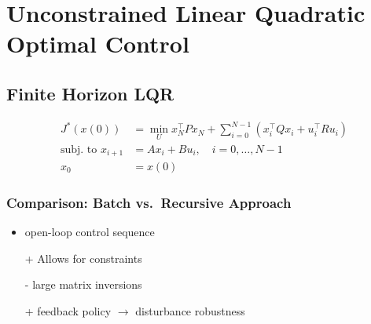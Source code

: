 \section{Unconstrained Linear Quadratic Optimal Control}
\subsection{Finite Horizon LQR}
\noindent
\begin{align*}
    J^*(x(0))                & = \min_U x_N^\top P x_N + \sum_{i=0}^{N-1} (x_i^\top Q x_i + u_i^\top R u_i) \\
    \text{subj.\ to }x_{i+1} & = A x_i + B u_i, \quad i = 0, \dots, N-1                                     \\
    x_0                      & = x(0)
\end{align*}
\subsubsection{Comparison: Batch vs.\ Recursive Approach}

\begin{itemize}
    \item open-loop control sequence
    \item [+] Allows for constraints
    \item [-] large matrix inversions
\end{itemize}

\newpar{}
\begin{itemize}
    \item [+] feedback policy $\to$ disturbance robustness
\end{itemize}


